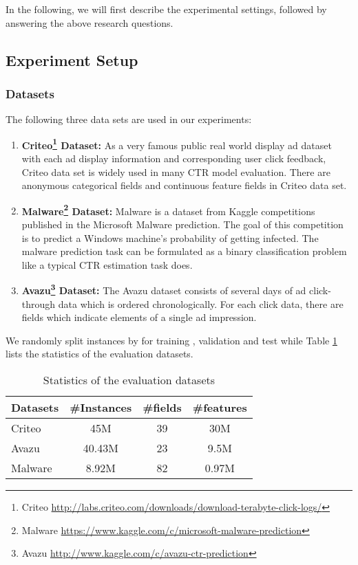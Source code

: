 \documentclass[sigconf]{acmart}
\begin{document}
In the following, we will  first describe the experimental settings, followed by answering the above research questions.

\subsection{Experiment Setup}

\subsubsection{Datasets}


The following three data sets are used in our experiments:

\begin{enumerate}
  \item \textbf{Criteo\footnote{Criteo \url{http://labs.criteo.com/downloads/download-terabyte-click-logs/}} Dataset:}
  As a very famous public real world display ad dataset with each ad display information and corresponding user click feedback, Criteo data set is widely used in many CTR model evaluation. There are  anonymous categorical fields and  continuous feature fields in Criteo data set.

  \item \textbf{Malware\footnote{Malware \url{https://www.kaggle.com/c/microsoft-malware-prediction}} Dataset:}
  Malware is a dataset from Kaggle competitions published in the Microsoft Malware prediction. The goal of this competition is to predict a Windows machine's probability of getting infected. The malware prediction task can be formulated as a binary classification problem like a typical CTR estimation task does.

  \item \textbf{Avazu\footnote{Avazu \url{http://www.kaggle.com/c/avazu-ctr-prediction}} Dataset:}
    The Avazu dataset consists of several days of ad click- through data which is ordered chronologically. For each click data, there are  fields which indicate elements of a single ad impression.
\end{enumerate}




We randomly split instances by  for training , validation and test while Table \ref{tab:datasets} lists the statistics of the evaluation datasets.

\begin{table}[h]
  \setlength{\abovecaptionskip}{1pt}
\centering
\caption{Statistics of the evaluation datasets}
\begin{tabular}{lccc}
\toprule
Datasets  & \#Instances & \#fields & \#features \\
\midrule
Criteo       & 45M  & 39 & 30M     \\
Avazu       & 40.43M  & 23 & 9.5M     \\
Malware     & 8.92M  & 82 & 0.97M \\
\bottomrule
\end{tabular}
\label{tab:datasets}
\end{table}
\end{document}
